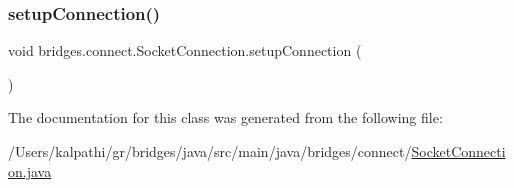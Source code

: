 \mbox{\label{classbridges_1_1connect_1_1_socket_connection_ac5467b4da6cd41b0cee00be5b4cbc60d}} 
\subsubsection{\texorpdfstring{setupConnection()}{setupConnection()}}
{\footnotesize\ttfamily void bridges.\+connect.\+Socket\+Connection.\+setup\+Connection (\begin{DoxyParamCaption}{ }\end{DoxyParamCaption})}



The documentation for this class was generated from the following file\+:\begin{DoxyCompactItemize}
\item 
/\+Users/kalpathi/gr/bridges/java/src/main/java/bridges/connect/\mbox{\hyperlink{_socket_connection_8java}{Socket\+Connection.\+java}}\end{DoxyCompactItemize}
